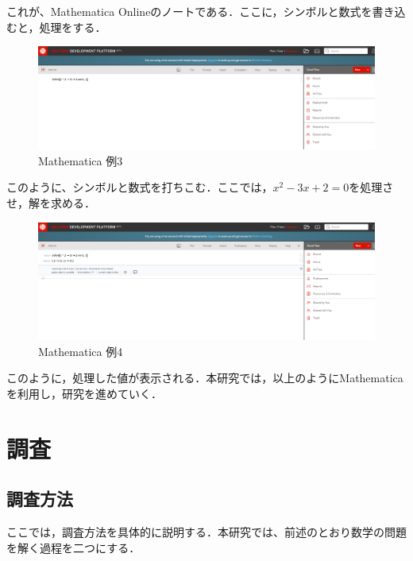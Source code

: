 これが、Mathematica Onlineのノートである．ここに，シンボルと数式を書き込むと，処理をする．

\clearpage

\begin{figure}[h]
\centering
\includegraphics[width=15cm]{mathematica4.png}
\caption{Mathematica 例3}\label{図}
\end{figure}

このように、シンボルと数式を打ちこむ．ここでは，$x^2-3x+2=0$を処理させ，解を求める．

\begin{figure}[h]
\centering
\includegraphics[width=15cm]{mathematica5.png}
\caption{Mathematica 例4}\label{図}
\end{figure}

このように，処理した値が表示される．本研究では，以上のようにMathematicaを利用し，研究を進めていく．


\chapter{調査}

\section{調査方法}

ここでは，調査方法を具体的に説明する．本研究では、前述のとおり数学の問題を解く過程を二つにする．

